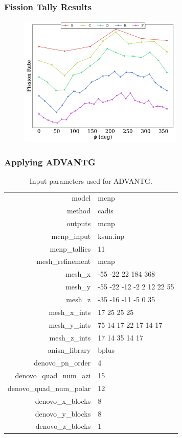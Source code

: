 \documentclass[fleqn]{beamer}
\begin{document}
\begin{frame}
\frametitle{Fission Tally Results}

\begin{figure}
\centering
\includegraphics[width = 0.7\textwidth]{totals_azi}
\caption{}
\end{figure}

\end{frame}

\begin{frame}
\frametitle{Applying ADVANTG}

\begin{table}[h]\centering
\label{tab:advantg_params}
\caption{Input parameters used for ADVANTG.}
\begin{tabular}{ r | l }
\toprule
model                     &   mcnp\\
method                    &   cadis\\
outputs                   &   mcnp\\
mcnp\_input               &   ksun.inp\\
mcnp\_tallies             &   11\\
mesh\_refinement          &   mcnp\\
mesh\_x                   &   -55 -22 22 184 368\\
mesh\_y                   &   -55 -22 -12 -2 2 12 22 55\\
mesh\_z                   &   -35 -16 -11 -5 0 35\\
mesh\_x\_ints             &   17 25 25 25\\
mesh\_y\_ints             &   75 14 17 22 17 14 17\\
mesh\_z\_ints             &   17 14 35 14 17\\
anisn\_library            &   bplus\\
denovo\_pn\_order         &   4\\
denovo\_quad\_num\_azi    &   15\\
denovo\_quad\_num\_polar  &   12\\
denovo\_x\_blocks         &   8\\
denovo\_y\_blocks         &   8\\
denovo\_z\_blocks         &   1\\
\end{tabular}
\end{table}

\end{frame}
\end{document}
